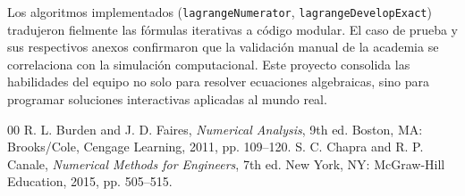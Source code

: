\documentclass[conference]{IEEEtran}
\begin{document}
Los algoritmos implementados (\texttt{lagrangeNumerator}, \texttt{lagrangeDevelopExact}) tradujeron fielmente las fórmulas iterativas a código modular. El caso de prueba y sus respectivos anexos confirmaron que la validación manual de la academia se correlaciona con la simulación computacional. Este proyecto consolida las habilidades del equipo no solo para resolver ecuaciones algebraicas, sino para programar soluciones interactivas aplicadas al mundo real.

\begin{thebibliography}{00}
 R. L. Burden and J. D. Faires, \textit{Numerical Analysis}, 9th ed. Boston, MA: Brooks/Cole, Cengage Learning, 2011, pp. 109--120.
 S. C. Chapra and R. P. Canale, \textit{Numerical Methods for Engineers}, 7th ed. New York, NY: McGraw-Hill Education, 2015, pp. 505--515.
\end{thebibliography}
\end{document}
